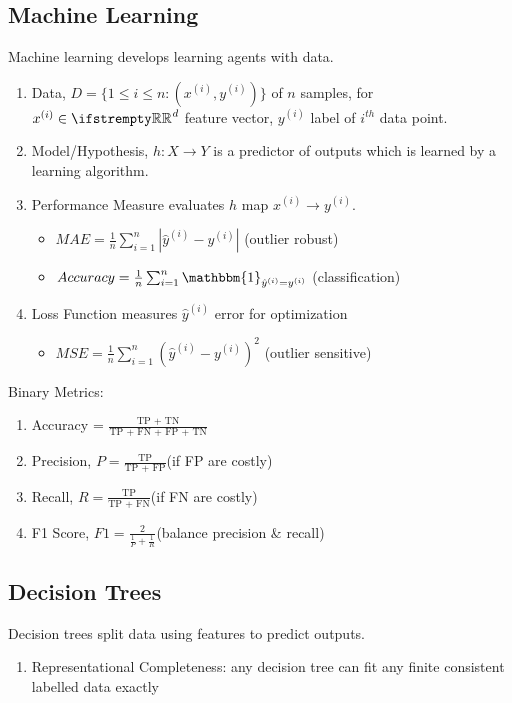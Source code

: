 \documentclass[12pt, a4paper]{article}
\begin{document}
\begin{multicols*}{3}
\section{Machine Learning}
Machine learning develops learning agents with data.
\begin{enumerate}[\roman*.]
  \item Data, $D = \{1 \leq i \leq n : (x^{(i)}, y^{(i)})\}$ of $n$ samples, for $x^{(i)} \in \RR^d$ feature vector, $y^{(i)}$ label of $i^{th}$ data point. 
  \item Model/Hypothesis, $h: X \rightarrow Y$ is a predictor of outputs which is learned by a learning algorithm.
  \item Performance Measure evaluates $h$ map $x^{(i)} \rightarrow y^{(i)}$.
    \begin{itemize}[leftmargin=*]\vspace{3pt}
      \item ${MAE}  = \frac{1}{n}\sum^n_{i=1} \left|\hat{y}^{(i)}-y^{(i)}\right|$ (outlier robust)
      \item ${Accuracy}  = \frac{1}{n}\sum^n_{i=1} \mathbbm{1}_{\hat{y}^{(i)}=y^{(i)}}$ (classification) 
    \end{itemize}
  \item Loss Function measures $\hat{y}^{(i)}$ error for optimization
    \begin{itemize}[leftmargin=*]\vspace{3pt}
      \item ${MSE}  = \frac{1}{n}\sum^n_{i=1} \left(\hat{y}^{(i)}-y^{(i)}\right)^2$ (outlier sensitive)
    \end{itemize}
\end{enumerate}

Binary Metrics:
\begin{enumerate}[\roman*.]
  \item Accuracy = $\frac{\text{TP + TN}}{\text{TP + FN + FP + TN}}$
  \item Precision, $P = \frac{\text{TP}}{\text{TP + FP}}$\hfill(if FP are costly)
  \item Recall, $R = \frac{\text{TP}}{\text{TP + FN}}$\hfill(if FN are costly)
  \item F1 Score, $F1 = \frac{2}{\frac{1}{P} + \frac{1}{R}}$\hfill(balance precision \& recall)
\end{enumerate}

\subsection{Decision Trees}
Decision trees split data using features to predict outputs.
\begin{enumerate}[\roman*.]
  \item Representational Completeness: any decision tree can fit any finite consistent labelled data exactly 
\end{enumerate}


\end{multicols*}
\end{document}
